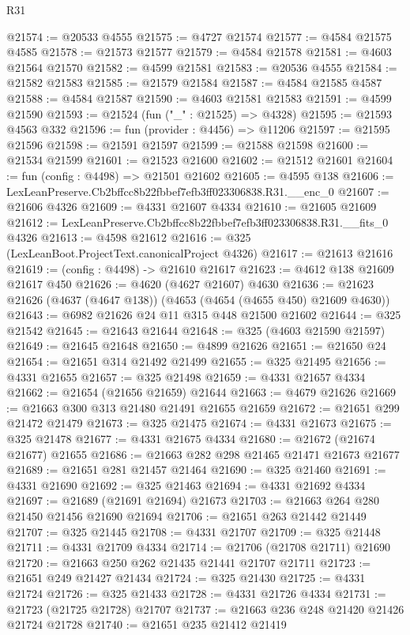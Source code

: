 \begin{lexlean}{R31}
\begin{coremodule}
@21574 := @20533 @4555
@21575 := @4727 @21574
@21577 := @4584 @21575 @4585
@21578 := @21573 @21577
@21579 := @4584 @21578
@21581 := @4603 @21564 @21570
@21582 := @4599 @21581
@21583 := @20536 @4555
@21584 := @21582 @21583
@21585 := @21579 @21584
@21587 := @4584 @21585 @4587
@21588 := @4584 @21587
@21590 := @4603 @21581 @21583
@21591 := @4599 @21590
@21593 := @21524 (fun ("_" : @21525) => @4328)
@21595 := @21593 @4563 @332
@21596 := fun (provider : @4456) => @11206
@21597 := @21595 @21596
@21598 := @21591 @21597
@21599 := @21588 @21598
@21600 := @21534 @21599
@21601 := @21523 @21600
@21602 := @21512 @21601
@21604 := fun (config : @4498) => @21501 @21602
@21605 := @4595 @138
@21606 := LexLeanPreserve.Cb2bffcc8b22fbbef7efb3ff023306838.R31.__enc_0
@21607 := @21606 @4326
@21609 := @4331 @21607 @4334
@21610 := @21605 @21609
@21612 := LexLeanPreserve.Cb2bffcc8b22fbbef7efb3ff023306838.R31.__fits_0 @4326
@21613 := @4598 @21612
@21616 := @325 (LexLeanBoot.ProjectText.canonicalProject @4326)
@21617 := @21613 @21616
@21619 := (config : @4498) -> @21610 @21617
@21623 := @4612 @138 @21609 @21617 @450
@21626 := @4620 (@4627 @21607) @4630
@21636 := @21623 @21626 (@4637 (@4647 @138)) (@4653 (@4654 (@4655 @450) @21609 @4630))
@21643 := @6982 @21626 @24 @11 @315 @448 @21500 @21602
@21644 := @325 @21542
@21645 := @21643 @21644
@21648 := @325 (@4603 @21590 @21597)
@21649 := @21645 @21648
@21650 := @4899 @21626
@21651 := @21650 @24
@21654 := @21651 @314 @21492 @21499
@21655 := @325 @21495
@21656 := @4331 @21655
@21657 := @325 @21498
@21659 := @4331 @21657 @4334
@21662 := @21654 (@21656 @21659) @21644
@21663 := @4679 @21626
@21669 := @21663 @300 @313 @21480 @21491 @21655 @21659
@21672 := @21651 @299 @21472 @21479
@21673 := @325 @21475
@21674 := @4331 @21673
@21675 := @325 @21478
@21677 := @4331 @21675 @4334
@21680 := @21672 (@21674 @21677) @21655
@21686 := @21663 @282 @298 @21465 @21471 @21673 @21677
@21689 := @21651 @281 @21457 @21464
@21690 := @325 @21460
@21691 := @4331 @21690
@21692 := @325 @21463
@21694 := @4331 @21692 @4334
@21697 := @21689 (@21691 @21694) @21673
@21703 := @21663 @264 @280 @21450 @21456 @21690 @21694
@21706 := @21651 @263 @21442 @21449
@21707 := @325 @21445
@21708 := @4331 @21707
@21709 := @325 @21448
@21711 := @4331 @21709 @4334
@21714 := @21706 (@21708 @21711) @21690
@21720 := @21663 @250 @262 @21435 @21441 @21707 @21711
@21723 := @21651 @249 @21427 @21434
@21724 := @325 @21430
@21725 := @4331 @21724
@21726 := @325 @21433
@21728 := @4331 @21726 @4334
@21731 := @21723 (@21725 @21728) @21707
@21737 := @21663 @236 @248 @21420 @21426 @21724 @21728
@21740 := @21651 @235 @21412 @21419

\end{coremodule}
\end{lexlean}

